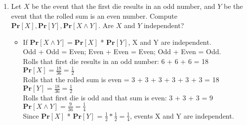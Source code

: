 \documentclass[11pt]{article}
\renewcommand{\Pr}{\ensuremath{\mathbf{Pr}}\xspace}
\begin{document}
\begin{description}
\begin{enumerate}
\begin{enumerate}
 \item
Let $X$ be the event that the first die results in an odd number, and $Y$ be the event that the rolled sum is an even number.  Compute $\Pr[X], \Pr[Y], \Pr[X \wedge Y]$.  Are $X$ and $Y$ independent?
	\begin{itemize}
	\item
	If $\Pr[X \wedge Y] = \Pr[X]$ * $\Pr[Y]$, X and Y are independent. \\
	Odd + Odd = Even; Even + Even = Even; Odd + Even = Odd. \\
	Rolls that first die results in an odd number: 6 + 6 + 6 = 18 \\
	$\Pr[X] = \frac{18}{36} = \frac{1}{2}$ \\
	Rolls that the rolled sum is even = 3 + 3 + 3 + 3 + 3 + 3 = 18 \\
	$\Pr[Y] = \frac{18}{36} = \frac{1}{2}$ \\
	Rolls that first die is odd and that sum is even: 3 + 3 + 3 = 9  \\
	$\Pr[X \wedge Y] = \frac{9}{36} =  \frac{1}{4}$ \\
	Since $\Pr[X]$ * $\Pr[Y]$ =  $\frac{1}{2} * \frac{1}{2} = \frac{1}{4}$, events X and Y are independent.
	\end{itemize}


\end{enumerate}
\end{enumerate}
\end{description}
\end{document}
